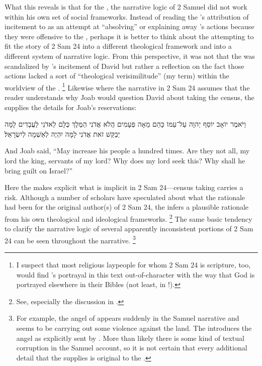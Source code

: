 What this reveals is that for the \chronicler, the narrative logic of 2 Samuel did not work within his own set of social frameworks. Instead of reading the \chronicler's attribution of incitement to  as an attempt at ``absolving'' or explaining away \yahweh's actions because they were offensive to the \chronicler, perhaps it is better to think about the \chronicler attempting to fit the story of 2 Sam 24 into a different theological framework and into a different system of narrative logic. From this perspective, it was not that the \chronicler was scandalized by \yahweh's incitement of David but rather a reflection on the fact those actions lacked a sort of ``theological verisimilitude'' (my term) within the worldview of the \chronicler.%
    \footnote{I suspect that most religious laypeople for whom 2 Sam 24 is scripture, too, would find \yahweh's portrayal in this text out-of-character with the way that God is portrayed elsewhere in their Bibles (not least, in \chronicles!).}
Likewise where the narrative in 2 Sam 24 assumes that the reader understands why Joab would question David about taking the census, the \chronicler supplies the details for Joab's reservations:
\begin{hebrewtext}
    וַיֹּאמֶר יוֹאָב יוֹסֵף יְהוָה עַל־עַמּוֹ כָּהֵם מֵאָה פְעָמִים הֲלֹא אֲדֹנִי הַמֶּלֶךְ כֻּלָּם לַאדֹנִי לַעֲבָדִים לָמָּה יְבַקֵּשׁ זֹאת אֲדֹנִי לָמָּה יִהְיֶה לְאַשְׁמָה לְיִשְׂרָאֵל׃
\end{hebrewtext}
\begin{translation}
    And Joab said, ``May \yahweh increase his people a hundred times. Are they not all, my lord the king, servants of my lord? Why does my lord seek this? Why shall he bring guilt on Israel?''
\end{translation}
\noindent
Here the \chronicler makes explicit what is implicit in 2 Sam 24---census taking carries a risk. Although a number of scholars have speculated about what the rationale had been for the original author(s) of 2 Sam 24, the \chronicler infers a plausible rationale from his own theological and ideological frameworks.%
    \footnote{See, especially the discussion in \cite[512--514]{mccarter1984}.}
The same basic tendency to clarify the narrative logic of several apparently inconsistent portions of 2 Sam 24 can be seen throughout the narrative.%
    \footnote{For example, the angel of \yahweh appears suddenly in the Samuel narrative and seems to be carrying out some violence against the land. The \chronicler introduces the angel as explicitly sent by \yahweh. More than likely there is some kind of textual corruption in the Samuel account, so it is not certain that every additional detail that the \chronicler supplies is original to the \chronicler.}

